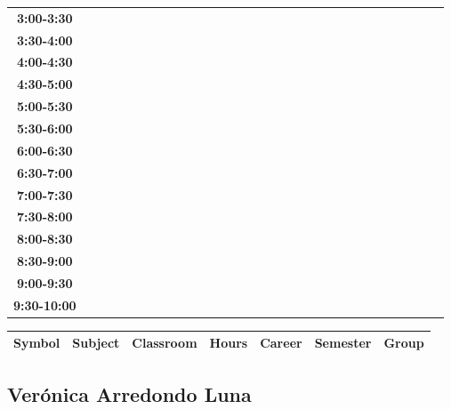 \documentclass{article}
\begin{document}
\begin{table}[ht]
\begin{tabular}{|c|c|c|c|c|c|c|c|c|c|c|c|c|c|c|c|c|c|c|c|c|c|c|c|c|c|c|c|c|c|}
\textbf{3:00-3:30} &   &   &   &   &   &   &   \\
 \cline{1-8} 
\textbf{3:30-4:00} &   &   &   &   &   &   &   \\
 \cline{1-8} 
\textbf{4:00-4:30} &   &   &   &   &   &   &   \\
 \cline{1-8} 
\textbf{4:30-5:00} &   &   &   &   &   &   &   \\
 \cline{1-8} 
\textbf{5:00-5:30} &   &   &   &   &   &   &   \\
 \cline{1-8} 
\textbf{5:30-6:00} &   &   &   &   &   &   &   \\
 \cline{1-8} 
\textbf{6:00-6:30} &   &   &   &   &   &   &   \\
 \cline{1-8} 
\textbf{6:30-7:00} &   &   &   &   &   &   &   \\
 \cline{1-8} 
\textbf{7:00-7:30} &   &   &   &   &   &   &   \\
 \cline{1-8} 
\textbf{7:30-8:00} &   &   &   &   &   &   &   \\
 \cline{1-8} 
\textbf{8:00-8:30} &   &   &   &   &   &   &   \\
 \cline{1-8} 
\textbf{8:30-9:00} &   &   &   &   &   &   &   \\
 \cline{1-8} 
\textbf{9:00-9:30} &   &   &   &   &   &   &   \\
 \cline{1-8} 
\textbf{9:30-10:00} &   &   &   &   &   &   &   \\
 \cline{1-8} 
\end{tabular}\end{table}

        
        \begin{tabular}{|>{\centering\arraybackslash}m{2cm}|>{\centering\arraybackslash}m{4cm}|>{\centering\arraybackslash}m{2cm}|>{\centering\arraybackslash}m{2cm}|>{\centering\arraybackslash}m{2cm}|>{\centering\arraybackslash}m{2cm}|>{\centering\arraybackslash}m{2cm}|}
        \hline
        \textbf{Symbol} & \textbf{Subject} & \textbf{Classroom} & \textbf{Hours} & \textbf{Career} & \textbf{Semester} & \textbf{Group} \\
        \hline
        \end{tabular}
                    

        \newpage
        

        \subsection{Ver\'onica Arredondo Luna}
        \vspace*{.1cm}
        
\end{document}

